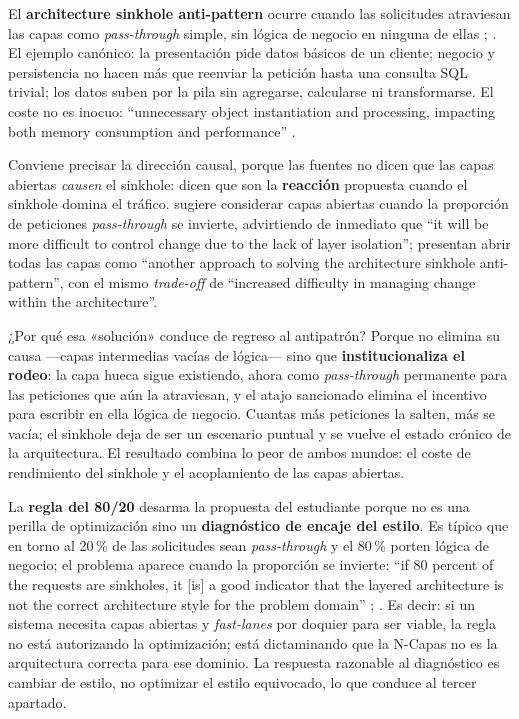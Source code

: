 El \textbf{architecture sinkhole anti-pattern} ocurre cuando las solicitudes atraviesan las
capas como \emph{pass-through} simple, sin lógica de negocio en ninguna de ellas
\parencite[7]{richards2015}; \parencite[cap.~10]{richardsford2020}. El ejemplo canónico: la
presentación pide datos básicos de un cliente; negocio y persistencia no hacen más que reenviar
la petición hasta una consulta SQL trivial; los datos suben por la pila sin agregarse,
calcularse ni transformarse. El coste no es inocuo: “unnecessary object instantiation and
processing, impacting both memory consumption and performance”
\parencite[cap.~10]{richardsford2020}.

Conviene precisar la dirección causal, porque las fuentes no dicen que las capas abiertas
\emph{causen} el sinkhole: dicen que son la \textbf{reacción} propuesta cuando el sinkhole
domina el tráfico. \textcite[7]{richards2015} sugiere considerar capas abiertas cuando la
proporción de peticiones \emph{pass-through} se invierte, advirtiendo de inmediato que “it will
be more difficult to control change due to the lack of layer isolation”;
\textcite[cap.~10]{richardsford2020} presentan abrir todas las capas como “another approach to
solving the architecture sinkhole anti-pattern”, con el mismo \emph{trade-off} de “increased
difficulty in managing change within the architecture”.

¿Por qué esa «solución» conduce de regreso al antipatrón? Porque no elimina su causa —capas
intermedias vacías de lógica— sino que \textbf{institucionaliza el rodeo}: la capa hueca sigue
existiendo, ahora como \emph{pass-through} permanente para las peticiones que aún la atraviesan,
y el atajo sancionado elimina el incentivo para escribir en ella lógica de negocio. Cuantas más
peticiones la salten, más se vacía; el sinkhole deja de ser un escenario puntual y se vuelve el
estado crónico de la arquitectura. El resultado combina lo peor de ambos mundos: el coste de
rendimiento del sinkhole y el acoplamiento de las capas abiertas.

La \textbf{regla del 80/20} desarma la propuesta del estudiante porque no es una perilla de
optimización sino un \textbf{diagnóstico de encaje del estilo}. Es típico que en torno al
20\,\% de las solicitudes sean \emph{pass-through} y el 80\,\% porten lógica de negocio; el
problema aparece cuando la proporción se invierte: “if 80 percent of the requests are sinkholes,
it [is] a good indicator that the layered architecture is not the correct architecture style for
the problem domain” \parencite[cap.~10]{richardsford2020}; \parencite[7]{richards2015}. Es
decir: si un sistema necesita capas abiertas y \emph{fast-lanes} por doquier para ser viable, la
regla no está autorizando la optimización; está dictaminando que la N-Capas no es la
arquitectura correcta para ese dominio. La respuesta razonable al diagnóstico es cambiar de
estilo, no optimizar el estilo equivocado, lo que conduce al tercer apartado.

